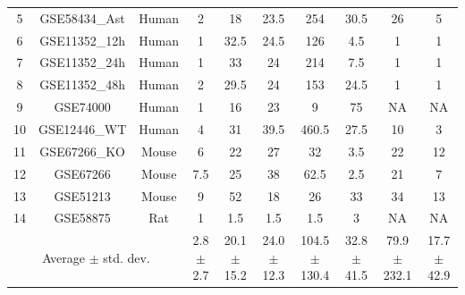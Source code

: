 \begin{table}
\begin{center}
\begin{tabular}{ ccc|ccccccc }
5	& GSE58434\_Ast& Human &	\cellcolor{green}2	&	18	&	23.5	&	254	&	30.5	&	26 & 5\\ 

6	& GSE11352\_12h & Human	&	\cellcolor{green}1	&	32.5	&	24.5	&	126	&	4.5	&	\cellcolor{green}1 & \cellcolor{green}1\\ 

7	& GSE11352\_24h & Human	&	\cellcolor{green}1	&	33	&	24	&	214	&	7.5	&	\cellcolor{green}1 & \cellcolor{green}1\\ 

8	& GSE11352\_48h & Human	&	2	&	29.5	&	24	&	153	&	24.5	&	\cellcolor{green}1 & \cellcolor{green}1\\ 

9	& GSE74000 & Human	&	\cellcolor{green}1	&	16	&	23	&	9	&	75	&	\cellcolor{red}NA & \cellcolor{red}NA\\ 

10	& GSE12446\_WT & Human	&	4	&	31	&	39.5	&	460.5	&	27.5	& 10 & 	\cellcolor{green}3\\ 

11	& GSE67266\_KO	& Mouse	&	6	&	22	&	27	&	32	&	\cellcolor{green}3.5	&	22 & 12\\ 

12	& GSE67266&	Mouse	&	7.5	&	25	&	38	&	62.5	&	\cellcolor{green}2.5	&	21 & 7\\ 

13	& GSE51213	& Mouse	&	\cellcolor{green}9	&	52	&	18	&	26	&	33	&	34 & 13\\ 

14	& GSE58875	& Rat 	&	\cellcolor{green}1	&	1.5	&	1.5	&	1.5	&	3	&	\cellcolor{red}NA & \cellcolor{red}NA\\ 
 \hline \hline
 \multicolumn{3}{c}{Average $\pm$ std. dev. }	 &\cellcolor{green} \makecell{2.8\\ $\pm$ 2.7 }	&	 \makecell{20.1\\ $\pm$ 15.2  }	&	 \makecell{24.0\\ $\pm$  12.3}	&	 \makecell{104.5\\ $\pm$    130.4 }	&	 \makecell{ 32.8 \\ $\pm$  41.5 }&	 \makecell{79.9\\ $\pm$ 232.1  }&  \makecell{17.7\\ $\pm$  42.9}\\ 

\end{tabular}

\end{center}
\end{table}

